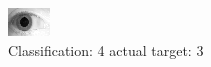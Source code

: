 \begin{figure}[h!]
\begin{center}
\includegraphics[width=0.60\columnwidth]{figures/ID1893_class_4_target_3.png}
\end{center}
\caption{ Classification: 4 actual target: 3}
\label{fig:ID1893_class_4_target_3}
\end{figure}
